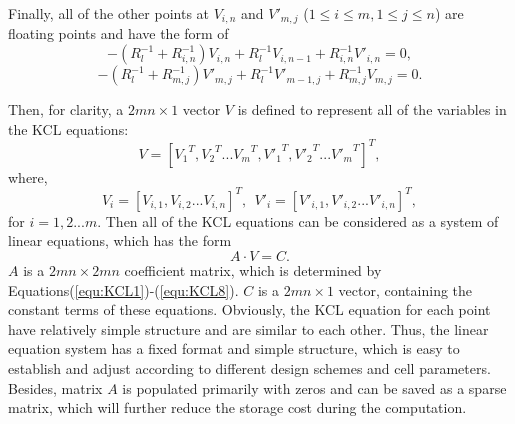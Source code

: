 Finally, all of the other points at $V_{i,n}$ and $V'_{m,j}$ ($1\leq i\leq
m, 1\leq j\leq n$) are floating points and have the form of
\begin{equation}\label{equ:KCL7}
 -(R_l^{-1}+R_{i,n}^{-1})V_{i,n}+ R_l^{-1}V_{i,n-1}+R_{i,n}^{-1}V'_{i,n}=0,
\end{equation}
\begin{equation}\label{equ:KCL8}
 -(R_l^{-1}+R_{m,j}^{-1})V'_{m,j}+ R_l^{-1}V'_{m-1,j}+R_{m,j}^{-1}V_{m,j}=0.
\end{equation}

Then, for clarity, a ${2mn\times 1}$ vector ${V}$ is defined to represent
all of the variables in the KCL equations:
\begin{equation}\label{equ:V1}
{V}=[{V_1}^T,{V_2}^T...{V_m}^T,{V'_1}^T,{V'_2}^T...{V'_m}^T]^T,
\end{equation}
where,
\begin{equation}\label{equ:V2}
{V_i} = [V_{i,1},V_{i,2}...V_{i,n}]^T,~~{V'_i} = [V'_{i,1},V'_{i,2}...V'_{i,n}]^T,
\end{equation}
for $i=1,2...m$. Then all of the KCL equations can be considered as a
system of linear equations, which has the form
\begin{equation}\label{equ:matrix}
A\cdot V = C.
\end{equation}
$A$ is a ${2mn\times{2mn}}$ coefficient matrix, which is determined by
Equations(\ref{equ:KCL1})-(\ref{equ:KCL8}). $C$ is a ${2mn\times{1}}$
vector, containing the constant terms of these equations. Obviously, the
KCL equation for each point have relatively simple structure and are
similar to each other. Thus, the linear equation system has a fixed format
and simple structure, which is easy to establish and adjust according to
different design schemes and cell parameters. Besides, matrix $A$ is
populated primarily with zeros and can be saved as a sparse matrix, which
will further reduce the storage cost during the computation.

